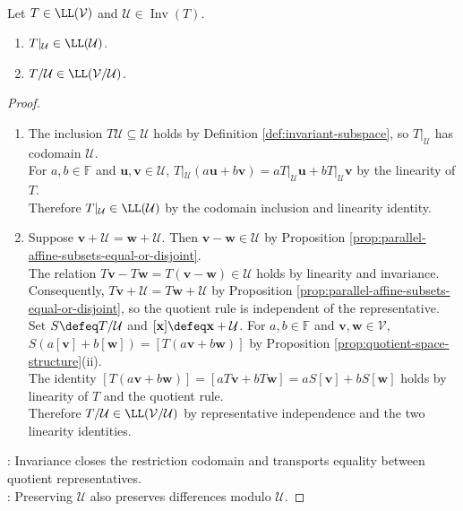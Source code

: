 \begin{proposition} \label{prop:restriction-and-quotient-operators-well-defined} \\
Let $T\in\LL(\mathcal{V})$ and $\mathcal{U}\in\operatorname{Inv}(T)$.
\begin{enumerate}[label=(\roman*)]
\setlength{\itemsep}{0pt}
\item $T|_{\mathcal{U}}\in\LL(\mathcal{U})$.
\item $T/\mathcal{U}\in\LL(\mathcal{V}/\mathcal{U})$.
\end{enumerate}
\begin{proof}
\begin{enumerate}[label=(\roman*)]
\setlength{\itemsep}{0pt}
\item The inclusion $T\mathcal{U}\subseteq\mathcal{U}$ holds by Definition \ref{def:invariant-subspace}, so $T|_{\mathcal{U}}$ has codomain $\mathcal{U}$.\\
For $a,b\in\mathbb{F}$ and $\mathbf{u},\mathbf{v}\in\mathcal{U}$, $T|_{\mathcal{U}}(a\mathbf{u}+b\mathbf{v})=aT|_{\mathcal{U}}\mathbf{u}+bT|_{\mathcal{U}}\mathbf{v}$ by the linearity of $T$.\\
Therefore $T|_{\mathcal{U}}\in\LL(\mathcal{U})$ by the codomain inclusion and linearity identity.
\item Suppose $\mathbf{v}+\mathcal{U}=\mathbf{w}+\mathcal{U}$. Then $\mathbf{v}-\mathbf{w}\in\mathcal{U}$ by Proposition \ref{prop:parallel-affine-subsets-equal-or-disjoint}.\\
The relation $T\mathbf{v}-T\mathbf{w}=T(\mathbf{v}-\mathbf{w})\in\mathcal{U}$ holds by linearity and invariance.\\
Consequently, $T\mathbf{v}+\mathcal{U}=T\mathbf{w}+\mathcal{U}$ by Proposition \ref{prop:parallel-affine-subsets-equal-or-disjoint}, so the quotient rule is independent of the representative.\\
Set $S\defeq T/\mathcal{U}$ and $[\mathbf{x}]\defeq\mathbf{x}+\mathcal{U}$. For $a,b\in\mathbb{F}$ and $\mathbf{v},\mathbf{w}\in\mathcal{V}$, $S(a[\mathbf{v}]+b[\mathbf{w}])=[T(a\mathbf{v}+b\mathbf{w})]$ by Proposition \ref{prop:quotient-space-structure}(ii).\\
The identity $[T(a\mathbf{v}+b\mathbf{w})]=[aT\mathbf{v}+bT\mathbf{w}]=aS[\mathbf{v}]+bS[\mathbf{w}]$ holds by linearity of $T$ and the quotient rule.\\
Therefore $T/\mathcal{U}\in\LL(\mathcal{V}/\mathcal{U})$ by representative independence and the two linearity identities.
\end{enumerate}
: Invariance closes the restriction codomain and transports equality between quotient representatives.\\
: Preserving $\mathcal{U}$ also preserves differences modulo $\mathcal{U}$.
\end{proof}
\end{proposition}

